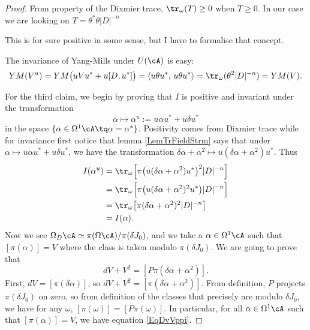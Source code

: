\begin{proof}
From property of the Dixmier trace, $\tr_{\omega}(T)\geq 0$ when $T\geq0$. In our case we are looking on $T=\theta^*\theta|D|^{-n}$

\begin{probleme}
	This is for sure positive in some sense, but I have to formalise that concept.
\end{probleme}

The invariance of Yang-Mills under $U(\cA)$ is easy:
\begin{equation}
YM(V^{u})=YM\big( uVu^*+u[D,u^*] \big)
		=\langle u\theta u^*,\,u\theta u^*\rangle
		=\tr_{\omega}(\theta^{2}|D|^{-n})
		=YM(V).
\end{equation}

For the third claim, we begin by proving that $I$ is positive and invariant under the transformation
\[ 
  \alpha\mapsto \alpha^{u}:=u\alpha u^*+u\delta u^*
\]
in the space $\{ \alpha\in\Omega^1\cA \tq\alpha=\alpha^* \}$. Positivity comes from Dixmier trace while for invariance first notice that lemma \ref{LemTrFieldStrm} says that under $\alpha\mapsto u\alpha u^*+u\delta u^*$, we have the transformation $\delta\alpha+\alpha^{2}\mapsto u(\delta\alpha+\alpha^{2})u^*$. Thus
\begin{align*}
  I(\alpha^{u})&=\tr_{\omega}\Big[ \pi\big( u(\delta\alpha+\alpha^{2})u^* \big)^{2}|D|^{-n}  \Big]\\
		&=\tr_{\omega}\Big[ \pi\big( u(\delta\alpha+\alpha^{2})^{2}u^* \big)|D|^{-n}  \Big]\\
		&=\tr_{\omega}\big[ \pi(\delta\alpha+\alpha^{2})^{2}|D|^{-n} \big]\\
		&=I(\alpha).
\end{align*}
Now we see $\Omega_D\cA\simeq\pi(\Omega\cA)/\pi(\delta J_0)$, and we take a $\alpha\in\Omega^1\cA$ such that $[\pi(\alpha)]=V$ where the class is taken modulo $\pi(\delta J_0)$. We are going to prove that 
\begin{equation} \label{EqDvVppi}
  dV+V^{2}=[P\pi(\delta\alpha+\alpha^{2})].
\end{equation}
First, $dV=[\pi(\delta\alpha)]$, so $dV+V^{2}=[\pi(\delta\alpha+\alpha^{2})]$. From definition, $P$ projects $\pi(\delta J_0)$ on zero, so from definition of the classes that precisely are modulo $\delta J_0$, we have for any $\omega$, $[\pi(\omega)]=[P\pi(\omega)]$. In particular, for all $\alpha\in\Omega^1\cA$ such that $[\pi(\alpha)]=V$, we have equation \eqref{EqDvVppi}. 

\end{proof}

